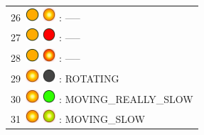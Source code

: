\documentclass[12pt, a4paper]{report}
\begin{document}
	\begin{minipage}{0.45\textwidth}
	\centering
	\begin{Large}
	\begin{tabular}{l}
		26\  \includegraphics*[width=5mm]{orange_led} \includegraphics*[width=5mm]{orange_led_flashing} : -----\\
		
		27\  \includegraphics*[width=5mm]{orange_led} \includegraphics*[width=5mm]{red_led} : -----\\
		
		28\  \includegraphics*[width=5mm]{orange_led} \includegraphics*[width=5mm]{red_led_flashing} : -----\\
		
		29\  \includegraphics*[width=5mm]{orange_led_flashing} \includegraphics*[width=5mm]{off_led} : ROTATING\\
		
		30\  \includegraphics*[width=5mm]{orange_led_flashing} \includegraphics*[width=5mm]{green_led} : MOVING\_REALLY\_SLOW\\
		
		31\  \includegraphics*[width=5mm]{orange_led_flashing} \includegraphics*[width=5mm]{green_led_flashing} : MOVING\_SLOW\\
		

\end{tabular}
\end{Large}
\end{minipage}
\end{document}
